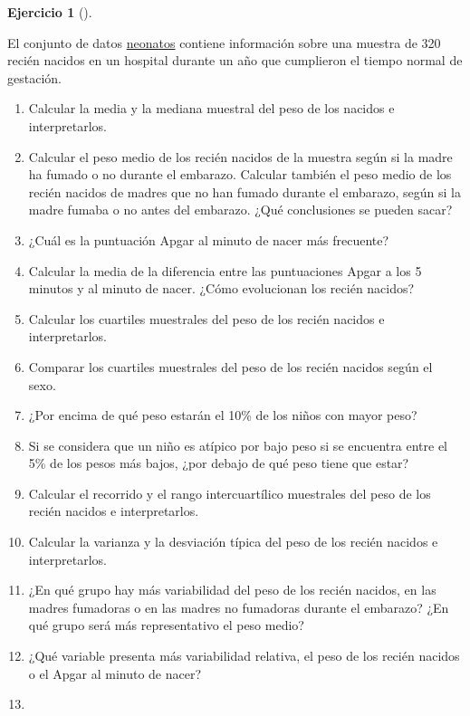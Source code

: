 \documentclass[
  a4paper,
]{scrreport}
\theoremstyle{definition}
\newtheorem{exercise}{Ejercicio}[chapter]
\theoremstyle{remark}
\begin{document}
\begin{exercise}[]\protect\hypertarget{exr-descriptiva-neonatos}{}\label{exr-descriptiva-neonatos}

El conjunto de datos \href{datos/neonatos.csv}{neonatos} contiene
información sobre una muestra de 320 recién nacidos en un hospital
durante un año que cumplieron el tiempo normal de gestación.

\begin{enumerate}
\def\labelenumi{\alph{enumi}.}
\item
  Calcular la media y la mediana muestral del peso de los nacidos e
  interpretarlos.
\item
  Calcular el peso medio de los recién nacidos de la muestra según si la
  madre ha fumado o no durante el embarazo. Calcular también el peso
  medio de los recién nacidos de madres que no han fumado durante el
  embarazo, según si la madre fumaba o no antes del embarazo. ¿Qué
  conclusiones se pueden sacar?
\item
  ¿Cuál es la puntuación Apgar al minuto de nacer más frecuente?
\item
  Calcular la media de la diferencia entre las puntuaciones Apgar a los
  5 minutos y al minuto de nacer. ¿Cómo evolucionan los recién nacidos?
\item
  Calcular los cuartiles muestrales del peso de los recién nacidos e
  interpretarlos.
\item
  Comparar los cuartiles muestrales del peso de los recién nacidos según
  el sexo.
\item
  ¿Por encima de qué peso estarán el 10\% de los niños con mayor peso?
\item
  Si se considera que un niño es atípico por bajo peso si se encuentra
  entre el 5\% de los pesos más bajos, ¿por debajo de qué peso tiene que
  estar?
\item
  Calcular el recorrido y el rango intercuartílico muestrales del peso
  de los recién nacidos e interpretarlos.
\item
  Calcular la varianza y la desviación típica del peso de los recién
  nacidos e interpretarlos.
\item
  ¿En qué grupo hay más variabilidad del peso de los recién nacidos, en
  las madres fumadoras o en las madres no fumadoras durante el embarazo?
  ¿En qué grupo será más representativo el peso medio?
\item
  ¿Qué variable presenta más variabilidad relativa, el peso de los
  recién nacidos o el Apgar al minuto de nacer?
\item

\end{enumerate}
\end{exercise}
\end{document}
